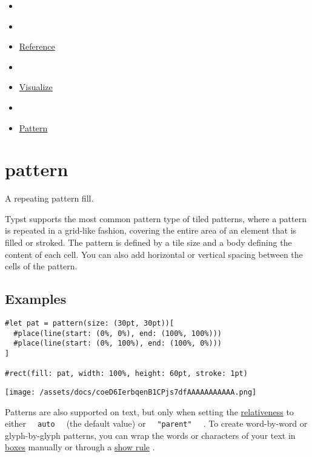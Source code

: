 \begin{itemize}
\tightlist
\item
  \href{/docs}{}
\item
  
\item
  \href{/docs/reference/}{Reference}
\item
  
\item
  \href{/docs/reference/visualize/}{Visualize}
\item
  
\item
  \href{/docs/reference/visualize/pattern/}{Pattern}
\end{itemize}

\section{\texorpdfstring{{ pattern }}{ pattern }}\label{summary}

A repeating pattern fill.

Typst supports the most common pattern type of tiled patterns, where a
pattern is repeated in a grid-like fashion, covering the entire area of
an element that is filled or stroked. The pattern is defined by a tile
size and a body defining the content of each cell. You can also add
horizontal or vertical spacing between the cells of the pattern.

\subsection{Examples}\label{examples}

\begin{verbatim}
#let pat = pattern(size: (30pt, 30pt))[
  #place(line(start: (0%, 0%), end: (100%, 100%)))
  #place(line(start: (0%, 100%), end: (100%, 0%)))
]

#rect(fill: pat, width: 100%, height: 60pt, stroke: 1pt)
\end{verbatim}

\texttt{[image: /assets/docs/coeD6IerbqenB1CPjs7dfAAAAAAAAAAA.png]}

Patterns are also supported on text, but only when setting the
\href{/docs/reference/visualize/pattern/\#parameters-relative}{relativeness}
to either \texttt{\ }{\texttt{\ auto\ }}\texttt{\ } (the default value)
or \texttt{\ }{\texttt{\ "parent"\ }}\texttt{\ } . To create
word-by-word or glyph-by-glyph patterns, you can wrap the words or
characters of your text in \href{/docs/reference/layout/box/}{boxes}
manually or through a \href{/docs/reference/styling/\#show-rules}{show
rule} .

